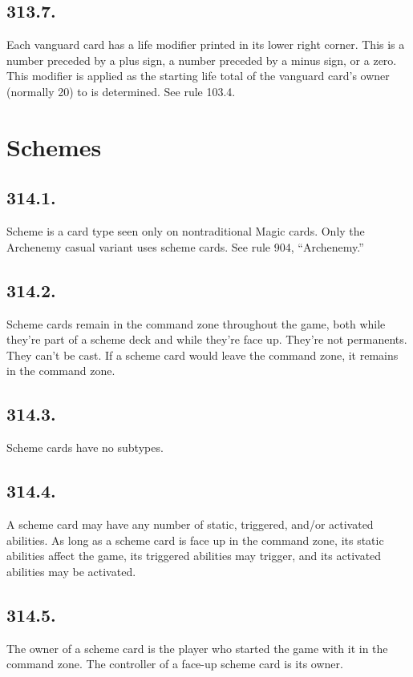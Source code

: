 \subsection*{313.7.}
Each vanguard card has a life modifier printed in its lower right corner. This is a number preceded by a plus sign, a number preceded by a minus sign, or a zero. This modifier is applied as the starting life total of the vanguard card’s owner (normally 20) to is determined. See rule 103.4.

\section{Schemes}
\subsection*{314.1.}
Scheme is a card type seen only on nontraditional Magic cards. Only the Archenemy casual variant uses scheme cards. See rule 904, “Archenemy.”

\subsection*{314.2.}
Scheme cards remain in the command zone throughout the game, both while they’re part of a scheme deck and while they’re face up. They’re not permanents. They can’t be cast. If a scheme card would leave the command zone, it remains in the command zone.

\subsection*{314.3.}
Scheme cards have no subtypes.

\subsection*{314.4.}
A scheme card may have any number of static, triggered, and/or activated abilities. As long as a scheme card is face up in the command zone, its static abilities affect the game, its triggered abilities may trigger, and its activated abilities may be activated.

\subsection*{314.5.}
The owner of a scheme card is the player who started the game with it in the command zone. The controller of a face-up scheme card is its owner.

